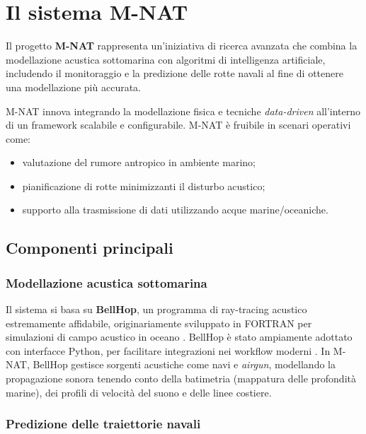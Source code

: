 \chapter{Il sistema M-NAT}

Il progetto \textbf{M-NAT} rappresenta un'iniziativa di ricerca avanzata che combina
la modellazione acustica sottomarina con algoritmi di intelligenza artificiale,
includendo il monitoraggio e la predizione delle rotte navali al fine di
ottenere una modellazione più accurata.

M-NAT innova integrando la modellazione fisica e tecniche \textit{data-driven} all'interno
di un framework scalabile e configurabile. M-NAT è fruibile in scenari operativi
come:
\begin{itemize}
  \item valutazione del rumore antropico in ambiente marino;

  \item pianificazione di rotte minimizzanti il disturbo acustico;

  \item supporto alla trasmissione di dati utilizzando acque marine/oceaniche.
\end{itemize}

\section{Componenti principali}

\subsection{Modellazione acustica sottomarina}

Il sistema si basa su \textbf{BellHop}, un programma di ray-tracing acustico
estremamente affidabile, originariamente sviluppato in FORTRAN per simulazioni di
campo acustico in oceano \cite{porter2011bellhop,long2012bellhop}. BellHop è
stato ampiamente adottato con interfacce Python, per facilitare integrazioni nei
workflow moderni \cite{fang2024bellhop}. In M-NAT, BellHop gestisce sorgenti acustiche
come navi e \textit{airgun}, modellando la propagazione sonora tenendo conto della
batimetria (mappatura delle profondità marine), dei profili di velocità del
suono e delle linee costiere.

\subsection{Predizione delle traiettorie navali}

